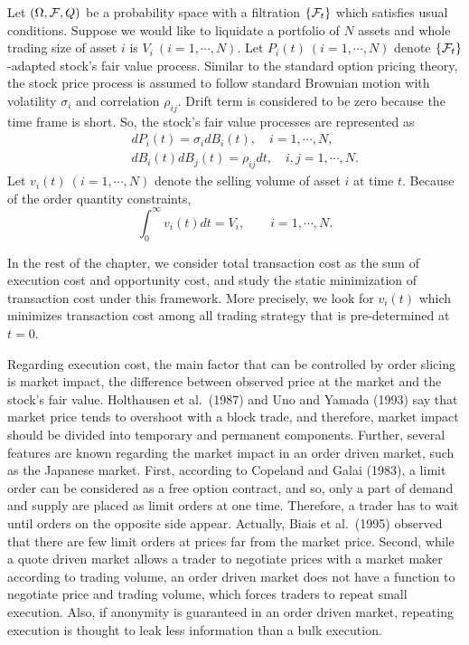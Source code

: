 Let $(\Omega, {\cal F}, Q)$ be a probability space with a filtration $\{ {\cal F}_t \}$ which satisfies usual conditions.  Suppose we would like to liquidate a portfolio of $N$ assets and whole trading size of asset $i$ is $V_i\ (i=1,\cdots,N)$.  Let $P_i(t)\ (i=1,\cdots,N)$ denote $\{ {\cal F}_t \}$-adapted stock's fair value process.  Similar to the standard option pricing theory, the stock price process is assumed to follow standard Brownian motion with volatility $\sigma_i$ and correlation $\rho_{ij}$.  Drift term is considered to be zero because the time frame is short.
 So, the stock's fair value processes are represented as
\begin{eqnarray*}
  & & dP_i(t) = \sigma_i dB_i(t), \quad i=1,\cdots,N, \\
  & & dB_i(t) dB_j(t) = \rho_{ij} dt, \quad i,j=1,\cdots,N.
\end{eqnarray*}
 Let $v_i(t)\ (i=1,\cdots,N)$ denote the selling volume of asset $i$ at time $t$.
 Because of the order quantity constraints,
\begin{equation}\label{eq_b1}
  \int_0^\infty v_i(t) dt = V_i, \qquad i=1,\cdots,N.
\end{equation}

 In the rest of the chapter, we consider total transaction cost as the sum of execution cost and opportunity cost, and study the static minimization of transaction cost under this framework.  More precisely, we look for $v_i(t)$ which minimizes transaction cost among all trading strategy that is pre-determined at $t=0$.

 Regarding execution cost, the main factor that can be controlled by order slicing is market impact, the difference between observed price at the market and the stock's fair value.  Holthausen et al.~(1987) and Uno and Yamada (1993) say that market price tends to overshoot with a block trade, and therefore, market impact should be divided into temporary and permanent components.  Further, several features are known regarding the market impact in an order driven market, such as the Japanese market.  First, according to Copeland and Galai (1983), a limit order can be considered as a free option contract, and so, only a part of demand and supply are placed as limit orders at one time.  Therefore, a trader has to wait until orders on the opposite side appear.  Actually, Biais et al.~(1995) observed that there are few limit orders at prices far from the market price.  Second, while a quote driven market allows a trader to negotiate prices with a market maker according to trading volume, an order driven market does not have a function to negotiate price and trading volume, which forces traders to repeat small execution.  Also, if anonymity is guaranteed in an order driven market, repeating execution is thought to leak less information than a bulk execution.  

